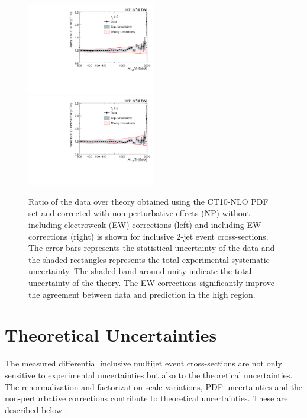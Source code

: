 \begin{figure}[!h]
 \begin{center}
 \hspace*{-5mm}\includegraphics[width=0.5\textwidth]{Plots_HT_2_150/Comparison_data_NLO_2_NoEW.pdf}
 ~~\includegraphics[width=0.5\textwidth]{Plots_HT_2_150/Comparison_data_NLO_2_EW.pdf}
 \caption[Ratio of the data over theory obtained using the CT10-NLO PDF set.]{Ratio of the data over theory obtained using the CT10-NLO PDF set and corrected with non-perturbative effects (NP) without including electroweak (EW) corrections (left) and including EW corrections (right) is shown for inclusive 2-jet event cross-sections. The error bars represents the statistical uncertainty of the data and the shaded rectangles represents the total experimental systematic uncertainty. The shaded band around unity indicate the total uncertainty of the theory. The EW corrections significantly improve the agreement between data and prediction in the high \httwo region.}
 \label{fig:EW_Comp}
 \end{center}
\end{figure}

\section{Theoretical Uncertainties}
\label{sec:theory_unc}
The measured differential inclusive multijet event cross-sections are not only sensitive to experimental uncertainties but also to the theoretical uncertainties. The renormalization and factorization scale variations, PDF uncertainties and the non-perturbative corrections contribute to theoretical uncertainties. These are described below : 

